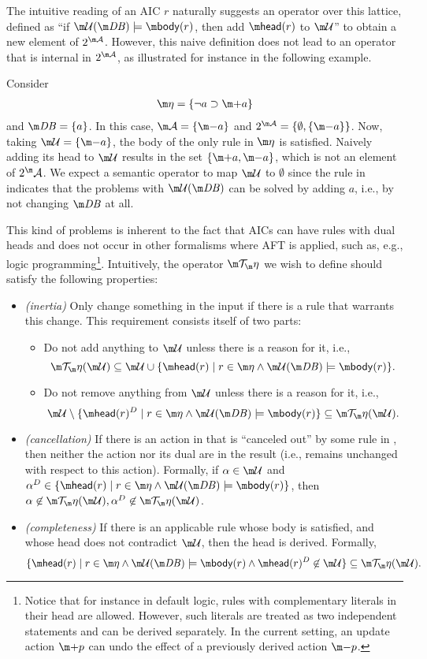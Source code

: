 The intuitive reading of an AIC $r$ naturally suggests an operator over this lattice, defined as ``if $\UU(\db)\models\body(r)$, then add $\head(r)$ to $\UU$'' to obtain a new element of $2^{\acts}$. However, this naive definition does not lead to an operator that is internal in $2^{\acts}$, as illustrated for instance in the following example.
\begin{example}
 Consider 
 \begin{align*}
  \aics = \{ \lnot a \aicrule \add a\} 
 \end{align*}
 and $\db=\{a\}$. 
 In this case, $\acts = \{\remove a\}$ and $2^{\acts} = \{ \emptyset, \{\remove a\}\}$.
 Now, taking $\UU = \{\remove a\}$, the body of the only rule in $\aics$ is satisfied.
 Naively adding its head to $\UU$ results in the set $\{\add a,\remove a\}$, which is not an element of $2^\acts$. 
 We expect a semantic operator to map $\UU$ to $\emptyset$ since the rule in \aics indicates that the problems with $\UU(\db)$ can be solved by adding $a$, i.e., by not changing $\db$ at all. 
\end{example}
This kind of problems is inherent to the fact that AICs can have rules with dual heads and does not occur in other formalisms where AFT is applied, such as, e.g., logic programming\footnote{Notice that for instance in default logic, rules with complementary literals in their head are allowed. However, such literals are treated as two independent statements and can be derived separately. In the current setting, an update action $\add p$ can undo the effect of a previously derived action $\remove p$.}. 
Intuitively, the operator $\Op$ we wish to define should satisfy the following properties:
\begin{itemize}
 \item \emph{(inertia)} Only change something in the input if there is a rule that warrants this change. 
 This requirement consists itself of two parts: 
 \begin{itemize}
 \item Do not add anything to $\UU$ unless there is a reason for it, i.e., \[\Op(\UU) \subseteq \UU \cup \{\head(r)\mid r\in \aics \land \UU(\db)\models\body(r)\}.\] 
 \item Do not remove anything from $\UU$ unless there is a reason for it, i.e.,  \[\UU \setminus \{\head(r)^D\mid r\in \aics \land \UU(\db)\models\body(r)\} \subseteq \Op(\UU).\] \end{itemize}
 \item \emph{(cancellation)} If there is an action in \UU that is ``canceled out'' by some rule in \aics, then neither the action nor its dual are in the result (i.e., \db remains unchanged with respect to this action). Formally, if $\alpha\in \UU$ and $\alpha^D \in \{\head(r)\mid r\in \aics \land \UU(\db)\models\body(r)\}$, then $\alpha\not \in \Op(\UU), \alpha^D\not \in \Op(\UU)$. 
 \item \emph{(completeness)} If there is an applicable rule whose body is satisfied, and whose head does not contradict $\UU$, then the head is derived. Formally, 
 \[ \{\head(r)\mid r\in \aics \land \UU(\db)\models\body(r) \land \head(r)^D \not \in \UU \}\subseteq \Op(\UU).\]  %
\end{itemize}
